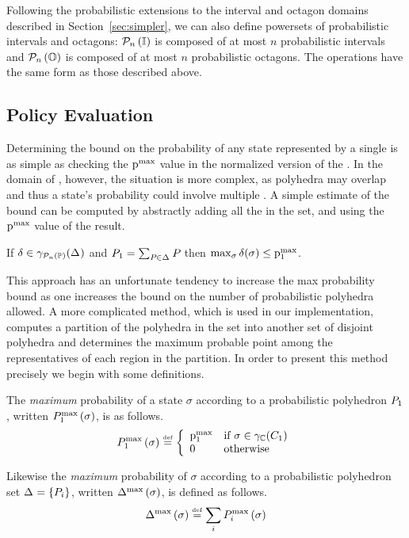 Following the probabilistic extensions to the interval and octagon
domains described in Section~\ref{sec:simpler}, we can also define
powersets of probabilistic intervals and octagons: $ \mathcal{P}_{n}\left( \mathbb{I} \right) $ is
composed of at most $ n $ probabilistic intervals and $ \mathcal{P}_{n}\left( \mathbb{O} \right)
$ is composed of at most $ n $ probabilistic octagons.  The
operations have the same form as those described above.

\subsection{Policy Evaluation}
\label{sec:poly-eval}

Determining the bound on the probability of any state represented by a
single \ppname{} is as simple as checking the $ \mathrm{p}^\mathrm{max}_{} $ value in the
normalized version of the \ppname{}. In the domain of \ppsnames{},
however, the situation is more complex, as polyhedra may overlap and
thus a state's probability could involve multiple \ppnames{}.
A simple estimate of the bound can be computed by abstractly adding all the 
\ppnames{} in the set, and using the $ \mathrm{p}^\mathrm{max}_{} $ value of the
result.

\begin{lemma}
\label{lem:ppp:prob-bound}
If $ \delta \in \gamma_{\mathcal{P}_{n}\left( \mathbb{P} \right)}(\Delta_{}) $ and $ P_{1} = \sum_{P_{} \in \Delta_{}} P_{}
$ then $ \max_{\sigma} \delta(\sigma) \leq \mathrm{p}^\mathrm{max}_{1} $.
\end{lemma}

This approach has an unfortunate tendency to increase the max probability
bound as one increases the bound on the number of
probabilistic polyhedra allowed.  A more complicated method, which is
used in our implementation, computes a partition of the polyhedra in
the set into another set of disjoint polyhedra and determines the
maximum probable point among the representatives of each region in the
partition. In order to present this method precisely we begin with
some definitions. 

\begin{definition} \label{def:max_prob} The \emph{maximum} probability of a state $ \sigma $ according to
a probabilistic polyhedron $ P_{1} $, written $
P_{1}^{\text{max}}\left( \sigma \right) $, is as follows.
$$ P_{1}^{\text{max}}\left( \sigma \right) \stackrel{\smash{\scriptscriptstyle \mathrm{def}}}= \left\{
   \begin{array}{ll}
   \mathrm{p}^\mathrm{max}_{1} & \text{if } \sigma \in \gamma_{\mathbb{C}}(C_{1}) \\
   0        & \text{otherwise}
\end{array}
\right.
$$

Likewise the \emph{maximum} probability of $ \sigma $ according to a
probabilistic polyhedron set $ \Delta_{} = \left\{ P_{i} \right\} $, written $
\Delta_{}^{\text{max}}\left( \sigma \right) $, is defined as follows.
$$ \Delta_{}^{\text{max}}\left( \sigma \right) \stackrel{\smash{\scriptscriptstyle \mathrm{def}}}= \sum_i P_{i}^{\text{max}}\left( \sigma \right) $$
\end{definition}

